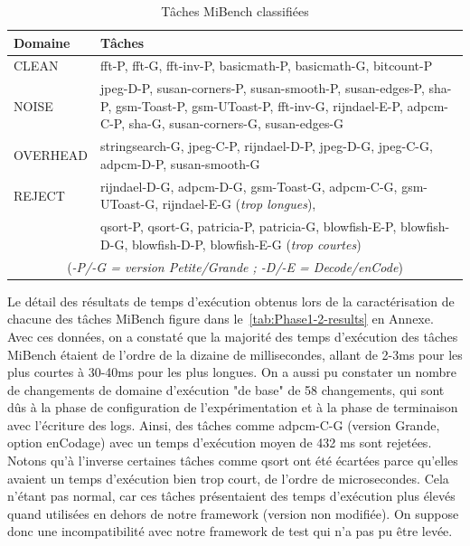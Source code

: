 \documentclass[french, a4paper, 11pt, twoside, pdftex]{StyleThese}
\begin{document}
\begin{table}[ht]
	\caption{Tâches MiBench classifiées}
	\label{tab:MiBench_classify}
	\centering
	\begin{tabularx}{\textwidth}{lX} %
		\toprule
		Domaine		& Tâches					\\
		\midrule
		CLEAN  		& fft-P, fft-G, fft-inv-P, basicmath-P, basicmath-G, bitcount-P						\\
		NOISE     	& jpeg-D-P, susan-corners-P, susan-smooth-P, susan-edges-P, sha-P, gsm-Toast-P, gsm-UToast-P, fft-inv-G, rijndael-E-P, adpcm-C-P, sha-G, susan-corners-G, susan-edges-G 		   					\\
		OVERHEAD    & stringsearch-G, jpeg-C-P, rijndael-D-P, jpeg-D-G, jpeg-C-G, adpcm-D-P, susan-smooth-G	   	\\
		REJECT      & rijndael-D-G, adpcm-D-G, gsm-Toast-G, adpcm-C-G, gsm-UToast-G, rijndael-E-G (\textit{trop longues}), \\
					& qsort-P, qsort-G, patricia-P, patricia-G, blowfish-E-P, blowfish-D-G, blowfish-D-P, blowfish-E-G (\textit{trop courtes})				\\
		\bottomrule
		\multicolumn{2}{c}{(\textit{-P/-G = version Petite/Grande ; -D/-E = Decode/enCode}) }
	\end{tabularx}
\end{table}

 Le détail des résultats de temps d’exécution obtenus lors de la caractérisation de chacune des tâches MiBench figure dans le~\autoref{tab:Phase1-2-results} en Annexe. Avec ces données, on a constaté que la majorité des temps d'exécution des tâches MiBench étaient de l'ordre de la dizaine de millisecondes, allant de 2-3ms pour les plus courtes à 30-40ms pour les plus longues. On a aussi pu constater un nombre de changements de domaine d'exécution "de base" de 58 changements, qui sont dûs à la phase de configuration de l'expérimentation et à la phase de terminaison avec l'écriture des logs. Ainsi, des tâches comme adpcm-C-G (version Grande, option enCodage) avec un temps d'exécution moyen de 432 ms sont rejetées. Notons qu'à l'inverse certaines tâches comme qsort ont été écartées parce qu'elles avaient un temps d'exécution bien trop court, de l'ordre de microsecondes. Cela n'étant pas normal, car ces tâches présentaient des temps d'exécution plus élevés quand utilisées en dehors de notre framework (version non modifiée). On suppose donc une incompatibilité avec notre framework de test qui n'a pas pu être levée.
\end{document}
